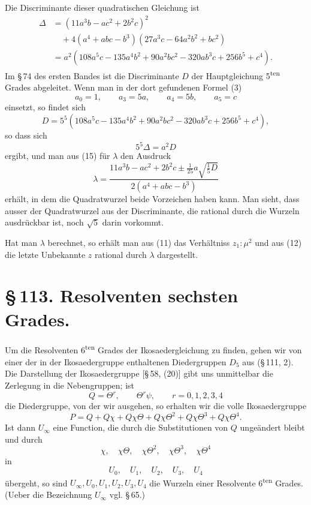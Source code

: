 \documentclass[11pt]{article}
\begin{document}
Die Discriminante dieser quadratischen Gleichung ist
\begin{align*}
\Delta&=(11a^3b-ac^2+2b^2c)^2\\
&\quad+4(a^4+abc-b^3)(27a^3c-64a^2b^2+bc^2)\\
&=a^2(108a^5c-135a^4b^2+90a^2bc^2-320ab^3c+256b^5+c^4).
\end{align*}
Im \S\,74 des ersten Bandes ist die Discriminante \(D\) der Hauptgleichung 5\textsuperscript{ten} Grades abgeleitet. Wenn man in der dort gefundenen Formel (3)
\[
a_0=1,
\qquad
a_3=5a,
\qquad
a_4=5b,
\qquad
a_5=c
\]
einsetzt, so findet sich
\[
D=5^5(108a^5c-135a^4b^2+90a^2bc^2-320ab^3c+256b^5+c^4),
\]
so dass sich
\begin{equation}
5^5\Delta=a^2D
\tag{16}
\end{equation}
ergibt, und man aus (15) für \(\lambda\) den Ausdruck
\[
\lambda=\frac{11a^3b-ac^2+2b^2c\pm\frac1{25}a\sqrt{\frac15D}}
{2(a^4+abc-b^3)}
\]
erhält, in dem die Quadratwurzel beide Vorzeichen haben kann. Man sieht, dass ausser der Quadratwurzel aus der Discriminante, die rational durch die Wurzeln ausdrückbar ist, noch \(\sqrt5\) darin vorkommt.

Hat man \(\lambda\) berechnet, so erhält man aus (11) das Verhältniss \(z_1:\mu^2\) und aus (12) die letzte Unbekannte \(z\) rational durch \(\lambda\) dargestellt.

\section*{\S\,113. Resolventen sechsten Grades.}

Um die Resolventen 6\textsuperscript{ten} Grades der Ikosaedergleichung zu finden, gehen wir von einer der in der Ikosaedergruppe enthaltenen Diedergruppen \(D_5\) aus (\S\,111, 2). Die Darstellung der Ikosaedergruppe [\S\,58, (20)] gibt uns unmittelbar die Zerlegung in die Nebengruppen; ist
\begin{equation}
Q=\Theta^r,
\qquad
\Theta^r\psi,
\qquad r=0,1,2,3,4
\tag{1}
\end{equation}
die Diedergruppe, von der wir ausgehen, so erhalten wir die volle Ikosaedergruppe
\begin{equation}
P=Q+Q\chi+Q\chi\Theta+Q\chi\Theta^2+Q\chi\Theta^3+Q\chi\Theta^4.
\tag{2}
\end{equation}
Ist dann \(U_\infty\) eine Function, die durch die Substitutionen von \(Q\) ungeändert bleibt und durch
\[
\chi,
\quad \chi\Theta,
\quad \chi\Theta^2,
\quad \chi\Theta^3,
\quad \chi\Theta^4
\]
in
\[
U_0,
\quad U_1,
\quad U_2,
\quad U_3,
\quad U_4
\]
übergeht, so sind \(U_\infty,U_0,U_1,U_2,U_3,U_4\) die Wurzeln einer Resolvente 6\textsuperscript{ten} Grades. (Ueber die Bezeichnung \(U_\infty\) vgl. \S\,65.)
\end{document}
